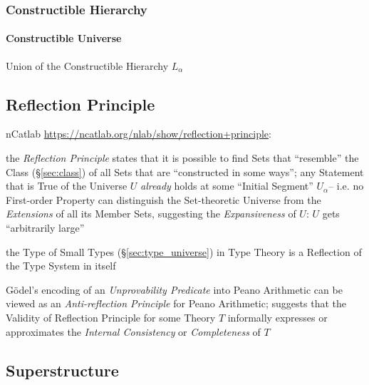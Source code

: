 \subsubsection{Constructible Hierarchy}\label{sec:constructible_hierarchy}

\paragraph{Constructible Universe}\label{sec:constructible_universe}\hfill

Union of the Constructible Hierarchy $L_\alpha$



\subsection{Reflection Principle}\label{sec:reflection_principle}

nCatlab \url{https://ncatlab.org/nlab/show/reflection+principle}:

the \emph{Reflection Principle} states that it is possible to find
Sets that ``resemble'' the Class (\S\ref{sec:class}) of all Sets that
are ``constructed in some ways''; any Statement that is True of the
Universe $U$ \emph{already} holds at some ``Initial Segment''
$U_\alpha$-- i.e. no First-order Property can distinguish the
Set-theoretic Universe from the \emph{Extensions} of all its Member
Sets, suggesting the \emph{Expansiveness} of $U$: $U$ gets
``arbitrarily large''


the Type of Small Types (\S\ref{sec:type_universe}) in Type Theory is
a Reflection of the Type System in itself

G\"odel's encoding of an \emph{Unprovability Predicate} into Peano
Arithmetic can be viewed as an \emph{Anti-reflection Principle} for
Peano Arithmetic; suggests that the Validity of Reflection Principle
for some Theory $T$ informally expresses or approximates the
\emph{Internal Consistency} or \emph{Completeness} of $T$



\subsection{Superstructure}\label{sec:superstructure}

